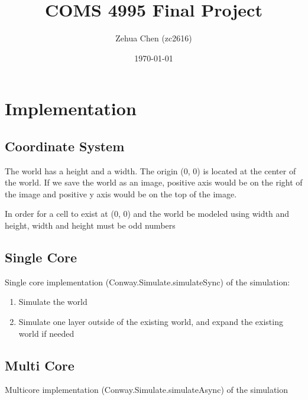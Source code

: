 \documentclass{article}
\title{COMS 4995 Final Project}
\author{Zehua Chen (zc2616)}
\date{\today}
\newcommand{\code}[1]{{\ttfamily #1}}
\begin{document}
  \maketitle
  \tableofcontents

  \setlength{\parskip}{8px}
  \setlength{\parindent}{0px}

  \section{Implementation}

    \subsection{Coordinate System}

      The world has a height and a width. The origin (0, 0) is located at the
      center of the world. If we save the world as an image, positive
      axis would be on the right of the image and positive y axis
      would be on the top of the image.

      In order for a cell to exist at (0, 0) and the world be modeled using
      width and height, width and height must be odd numbers

    \subsection{Single Core}

      Single core implementation (\code{Conway.Simulate.simulateSync})
      of the simulation:

      \begin{enumerate}
        \item \label{single: step-simulate} Simulate the world
        \item \label{single: step-grow} Simulate one layer outside of the existing world, and expand
        the existing world if needed
      \end{enumerate}

    \subsection{Multi Core}

      Multicore implementation (\code{Conway.Simulate.simulateAsync})
      of the simulation
\end{document}

